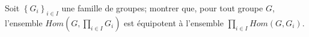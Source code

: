 Soit $\left\{ G_i \right\}_{i \in I}$ une famille de groupes; montrer que, pour tout groupe $G$, l'ensemble $ \displaystyle Hom \left( G, \prod_{i \in I} G_i \right)$ est équipotent
à l'ensemble $\displaystyle \prod_{i \in I} Hom(G, G_i)$.